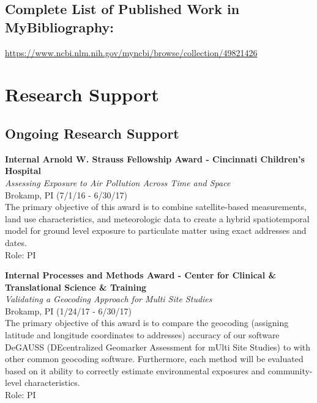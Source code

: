 \documentclass{nihbiosketch}
\begin{document}
\subsection*{Complete List of Published Work in MyBibliography:} 
\url{https://www.ncbi.nlm.nih.gov/myncbi/browse/collection/49821426}



\section{Research Support}

\subsection*{Ongoing Research Support}

\bigskip

\textbf{Internal Arnold W. Strauss Fellowship Award - Cincinnati
	Children's Hospital}\\
\emph{Assessing Exposure to Air Pollution Across Time and Space}\\
Brokamp, PI (7/1/16 - 6/30/17)\\
The primary objective of this award is to combine satellite-based
measurements, land use characteristics, and meteorologic data to create
a hybrid spatiotemporal model for ground level exposure to particulate
matter using exact addresses and dates.\\
Role: PI

\bigskip

\textbf{Internal Processes and Methods Award - Center for Clinical \&
	Translational Science \& Training}\\
\emph{Validating a Geocoding Approach for Multi Site Studies}\\
Brokamp, PI (1/24/17 - 6/30/17)\\
The primary objective of this award is to compare the geocoding
(assigning latitude and longitude coordinates to addresses) accuracy of
our software DeGAUSS (DEcentralized Geomarker Assessment for mUlti Site
Studies) to with other common geocoding software. Furthermore, each
method will be evaluated based on it ability to correctly estimate
environmental exposures and community-level characteristics.\\
Role: PI

\bigskip
\end{document}
